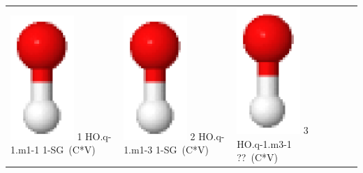 \documentclass[10pt]{article}
\begin{document}
\vspace{0.5cm}
\begin{tabular}{|
>{\centering\arraybackslash}p{2.40000000000000000000cm}|
>{\centering\arraybackslash}p{2.40000000000000000000cm}|
>{\centering\arraybackslash}p{2.40000000000000000000cm}|
>{\centering\arraybackslash}p{2.40000000000000000000cm}|
>{\centering\arraybackslash}p{2.40000000000000000000cm}|
}
\hline
\multicolumn{4}{|c|}{HO} \\\hline
\includegraphics[width=2.40000000000000000000cm]{HO.q-1.m1-1.eps} \tiny{1 \hspace{1.20000000000000000000cm} HO.q-1.m1-1 \hspace{5pt} 1-SG~(C*V)} &
\includegraphics[width=2.40000000000000000000cm]{HO.q-1.m1-3.eps} \tiny{2 \hspace{1.20000000000000000000cm} HO.q-1.m1-3 \hspace{5pt} 1-SG~(C*V)} &
\includegraphics[width=2.40000000000000000000cm]{HO.q-1.m3-1.eps} \tiny{3 \hspace{1.20000000000000000000cm} HO.q-1.m3-1 \hspace{5pt} ??~(C*V)} &

\end{tabular}
\end{document}
